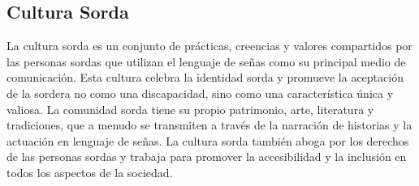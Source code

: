 \subsection{Cultura Sorda}
La cultura sorda es un conjunto de prácticas, creencias y valores compartidos por las personas sordas que utilizan el lenguaje de señas como su principal medio de comunicación. Esta cultura celebra la identidad sorda y promueve la aceptación de la sordera no como una discapacidad, sino como una característica única y valiosa. La comunidad sorda tiene su propio patrimonio, arte, literatura y tradiciones, que a menudo se transmiten a través de la narración de historias y la actuación en lenguaje de señas. La cultura sorda también aboga por los derechos de las personas sordas y trabaja para promover la accesibilidad y la inclusión en todos los aspectos de la sociedad.


